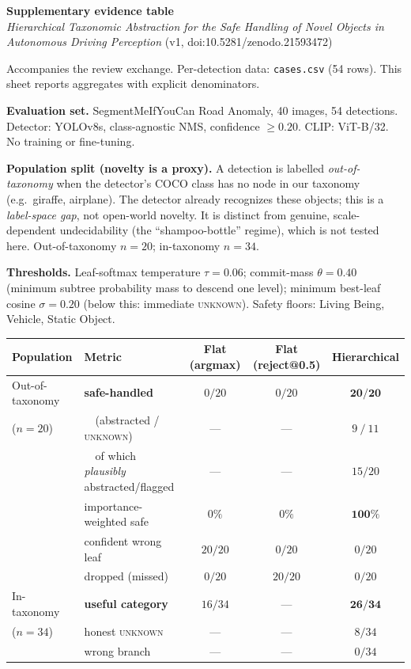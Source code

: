 \documentclass[10pt]{article}
\begin{document}
{\large\bfseries Supplementary evidence table}\\
{\itshape Hierarchical Taxonomic Abstraction for the Safe Handling of Novel
Objects in Autonomous Driving Perception} (v1, doi:10.5281/zenodo.21593472)

Accompanies the review exchange. Per-detection data: \texttt{cases.csv}
(54 rows). This sheet reports aggregates with explicit denominators.

\textbf{Evaluation set.} SegmentMeIfYouCan Road Anomaly, 40 images, 54
detections. Detector: YOLOv8s, class-agnostic NMS, confidence $\geq 0.20$.
CLIP: ViT-B/32. No training or fine-tuning.

\textbf{Population split (novelty is a proxy).} A detection is labelled
\emph{out-of-taxonomy} when the detector's COCO class has no node in our
taxonomy (e.g.\ giraffe, airplane). The detector already recognizes these
objects; this is a \emph{label-space gap}, not open-world novelty. It is
distinct from genuine, scale-dependent undecidability (the ``shampoo-bottle''
regime), which is not tested here. Out-of-taxonomy $n=20$; in-taxonomy $n=34$.

\textbf{Thresholds.} Leaf-softmax temperature $\tau=0.06$; commit-mass
$\theta=0.40$ (minimum subtree probability mass to descend one level); minimum
best-leaf cosine $\sigma=0.20$ (below this: immediate \textsc{unknown}). Safety
floors: Living Being, Vehicle, Static Object.

\begin{table}[h]
\centering
\begin{tabular}{@{}llccc@{}}
\toprule
Population & Metric & Flat (argmax) & Flat (reject@0.5) & \textbf{Hierarchical} \\
\midrule
Out-of-taxonomy & \textbf{safe-handled} & $0/20$ & $0/20$ & $\mathbf{20/20}$ \\
($n=20$) & \ \ (abstracted / \textsc{unknown}) & --- & --- & $9\ /\ 11$ \\
 & \ \ of which \emph{plausibly} abstracted/flagged & --- & --- & $15/20$ \\
 & importance-weighted safe & $0\%$ & $0\%$ & $\mathbf{100\%}$ \\
 & confident wrong leaf & $20/20$ & $0/20$ & $0/20$ \\
 & dropped (missed) & $0/20$ & $20/20$ & $0/20$ \\
\midrule
In-taxonomy & \textbf{useful category} & $16/34$ & --- & $\mathbf{26/34}$ \\
($n=34$) & honest \textsc{unknown} & --- & --- & $8/34$ \\
 & wrong branch & --- & --- & $0/34$ \\
\bottomrule
\end{tabular}
\end{table}
\end{document}
